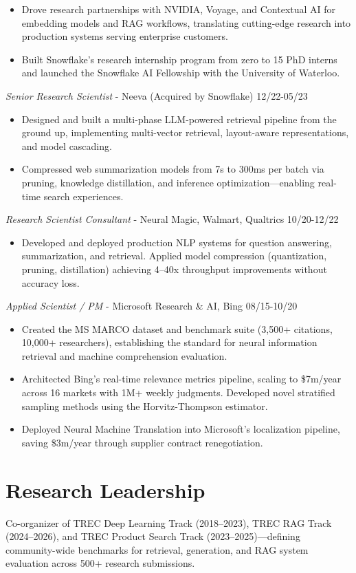 \documentclass[line,margin]{res}
\begin{document}
\begin{resume}
\begin{itemize}
\item Drove research partnerships with NVIDIA, Voyage, and Contextual AI for embedding models and RAG workflows, translating cutting-edge research into production systems serving enterprise customers.
\item Built Snowflake's research internship program from zero to 15 PhD interns and launched the Snowflake AI Fellowship with the University of Waterloo.
\end{itemize}
{\sl Senior Research Scientist} - Neeva (Acquired by Snowflake) \hfill 12/22-05/23
\begin{itemize} \itemsep -4pt
\item Designed and built a multi-phase LLM-powered retrieval pipeline from the ground up, implementing multi-vector retrieval, layout-aware representations, and model cascading.
\item Compressed web summarization models from 7s to 300ms per batch via pruning, knowledge distillation, and inference optimization---enabling real-time search experiences.
\end{itemize}
{\sl Research Scientist Consultant} - Neural Magic, Walmart, Qualtrics \hfill 10/20-12/22
\begin{itemize} \itemsep -4pt
\item Developed and deployed production NLP systems for question answering, summarization, and retrieval. Applied model compression (quantization, pruning, distillation) achieving 4--40x throughput improvements without accuracy loss.
\end{itemize}
{\sl Applied Scientist / PM} - Microsoft Research \& AI, Bing \hfill 08/15-10/20
\begin{itemize} \itemsep -4pt
\item Created the MS MARCO dataset and benchmark suite (3,500+ citations, 10,000+ researchers), establishing the standard for neural information retrieval and machine comprehension evaluation.
\item Architected Bing's real-time relevance metrics pipeline, scaling to \$7m/year across 16 markets with 1M+ weekly judgments. Developed novel stratified sampling methods using the Horvitz-Thompson estimator.
\item Deployed Neural Machine Translation into Microsoft's localization pipeline, saving \$3m/year through supplier contract renegotiation.
\end{itemize}
\section{Research Leadership}
Co-organizer of TREC Deep Learning Track (2018--2023), TREC RAG Track (2024--2026), and TREC Product Search Track (2023--2025)---defining community-wide benchmarks for retrieval, generation, and RAG system evaluation across 500+ research submissions.

\end{resume}
\end{document}
